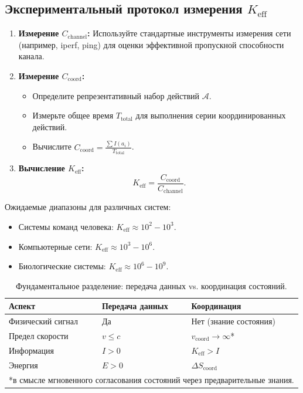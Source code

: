 \documentclass[12pt]{article}
\begin{document}
	\subsection{Экспериментальный протокол измерения $K_{\mathrm{eff}}$}
	\label{app:experiment}
	
	\begin{enumerate}
		\item \textbf{Измерение $C_{\text{channel}}$:} Используйте стандартные инструменты измерения сети (например, iperf, ping) для оценки эффективной пропускной способности канала.
		
		\item \textbf{Измерение $C_{\text{coord}}$:}
		\begin{itemize}
			\item Определите репрезентативный набор действий $\mathcal{A}$.
			\item Измерьте общее время $T_{\text{total}}$ для выполнения серии координированных действий.
			\item Вычислите $C_{\text{coord}} = \frac{\sum I(a_i)}{T_{\text{total}}}$.
		\end{itemize}
		
		\item \textbf{Вычисление $K_{\mathrm{eff}}$:}
		\[
		K_{\mathrm{eff}} = \frac{C_{\text{coord}}}{C_{\text{channel}}}.
		\]
	\end{enumerate}
	
	Ожидаемые диапазоны для различных систем:
	\begin{itemize}
		\item Системы команд человека: $K_{\mathrm{eff}} \approx 10^2 - 10^3$.
		\item Компьютерные сети: $K_{\mathrm{eff}} \approx 10^3 - 10^6$.
		\item Биологические системы: $K_{\mathrm{eff}} \approx 10^6 - 10^9$.
	\end{itemize}
	
	\begin{table}[htbp]
		\centering
		\caption{Фундаментальное разделение: передача данных vs. координация состояний.}
		\label{tab:separation}
		\begin{tabular}{lp{6cm}p{6cm}}
			\toprule
			\textbf{Аспект} & \textbf{Передача данных} & \textbf{Координация} \\
			\midrule
			Физический сигнал & Да & Нет (знание состояния) \\
			Предел скорости & $v \leq c$ & $v_{\text{coord}} \to \infty$* \\
			Информация & $I > 0$ & $K_{\text{eff}} > I$ \\
			Энергия & $E > 0$ & $\Delta S_{\text{coord}}$ \\
			\bottomrule
			\multicolumn{3}{l}{*в смысле мгновенного согласования состояний через предварительные знания.}
		\end{tabular}
	\end{table}
	
\end{document}
